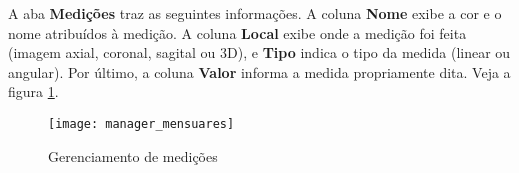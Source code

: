 A aba \textbf{Medições} traz as seguintes informações. A coluna \textbf{Nome} exibe a cor e o
nome atribuídos à medição. A coluna \textbf{Local} exibe onde a medição foi feita (imagem axial,
coronal, sagital ou 3D), e \textbf{Tipo} indica o tipo da medida (linear ou angular). Por último,
a coluna \textbf{Valor} informa a medida propriamente dita. Veja a figura \ref{fig:manager_mensuares}.

\begin{figure}[!htb]
\centering
\texttt{[image: manager\_mensuares]}
\caption{Gerenciamento de medições}
\label{fig:manager_mensuares}
\end{figure}

